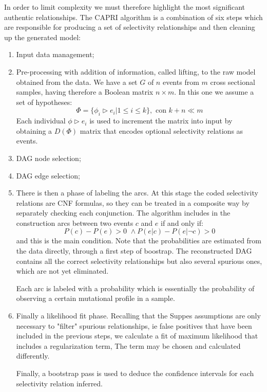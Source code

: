 In order to limit complexity we must therefore highlight the most significant authentic relationships. 
The CAPRI algorithm is a combination of six steps which are responsible for producing a set of 
selectivity relationships and then cleaning up the generated model:
\begin{enumerate}
    \item Input data management;
    \item Pre-processing with addition of information, called lifting, to the raw model obtained from the
        data. We have a set $G$ of $n$ events from $m$ cross sectional samples, having therefore a Boolean 
        matrix $n \times m$. In this one we assume a set of hypotheses:
        \begin{equation*}
            \Phi = \{\phi_i \rhd e_i | 1 \leq i \leq k\}, \text{ con } k + n \ll m
        \end{equation*}
        Each individual $\phi \rhd e_i$ is used to increment the matrix into input by obtaining a 
        $D(\Phi)$ matrix that encodes optional selectivity relations as events.
    \item DAG node selection;
    \item DAG edge selection;
    \item There is then a phase of labeling the arcs. At this stage the coded selectivity relations are CNF 
        formulas, so they can be treated in a composite way by separately checking each conjunction. The algorithm
        includes in the construction arcs between two events $c$ and $e$ if and only if:
        \begin{equation*}
            P(c) - P(e) > 0 \,\,\land P(e | c) - P(e | \lnot c) > 0
        \end{equation*}
        and this is the main condition. Note that the probabilities are estimated from the data directly, through 
        a first step of boostrap. The reconstructed DAG contains all the correct selectivity relationships but also 
        several spurious ones, which are not yet eliminated.
        
        Each arc is labeled with a probability which is essentially the probability of observing a certain mutational 
        profile in a sample.
    \item Finally a likelihood fit phase. Recalling that the Suppes assumptions are only necessary to "filter" spurious
        relationships, ie false positives that have been included in the previous steps, we calculate a fit of maximum
        likelihood that includes a regularization term, The term may be chosen and calculated differently.

        Finally, a bootstrap pass is used to deduce the confidence intervals for each selectivity relation inferred.
\end{enumerate}

